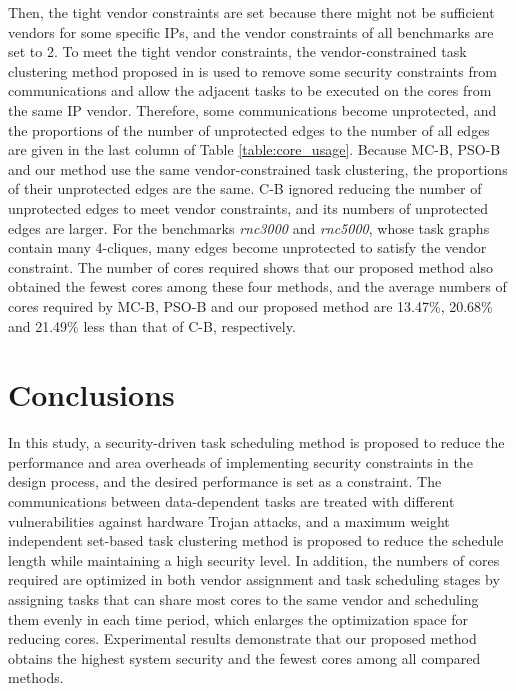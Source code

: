 \documentclass[10pt,journal, compsoc]{IEEEtran}
\begin{document}
Then, the tight vendor constraints are set because there might not be sufficient vendors for some specific IPs, and the vendor constraints of all benchmarks are set to 2. To meet the tight vendor constraints, the vendor-constrained task clustering method proposed in \cite{article:NW} is used to remove some security constraints from communications and allow the adjacent tasks to be executed on the cores from the same IP vendor. Therefore, some communications become unprotected, and the proportions of the number of unprotected edges to the number of all edges are given in the last column of Table \ref{table:core_usage}. Because MC-B, PSO-B and our method use the same vendor-constrained task clustering, the proportions of their unprotected edges are the same. C-B ignored reducing the number of unprotected edges to meet vendor constraints, and its numbers of unprotected edges are larger. For the benchmarks \textit{rnc3000} and \textit{rnc5000}, whose task graphs contain many 4-cliques, many edges become unprotected to satisfy the vendor constraint. The number of cores required shows that our proposed method also obtained the fewest cores among these four methods, and the average numbers of cores required by MC-B, PSO-B and our proposed method are 13.47\%, 20.68\% and 21.49\% less than that of C-B, respectively.





\section{Conclusions}

In this study, a security-driven task scheduling method is proposed to reduce the performance and area overheads of implementing security constraints in the design process, and the desired performance is set as a constraint. The communications between data-dependent tasks are treated with different vulnerabilities against hardware Trojan attacks, and a maximum weight independent set-based task clustering method is proposed to reduce the schedule length while maintaining a high security level. In addition, the numbers of cores required are optimized in both vendor assignment and task scheduling stages by assigning tasks that can share most cores to the same vendor and scheduling them evenly in each time period, which enlarges the optimization space for reducing cores. Experimental results demonstrate that our proposed method obtains the highest system security and the fewest cores among all compared methods.
\end{document}
